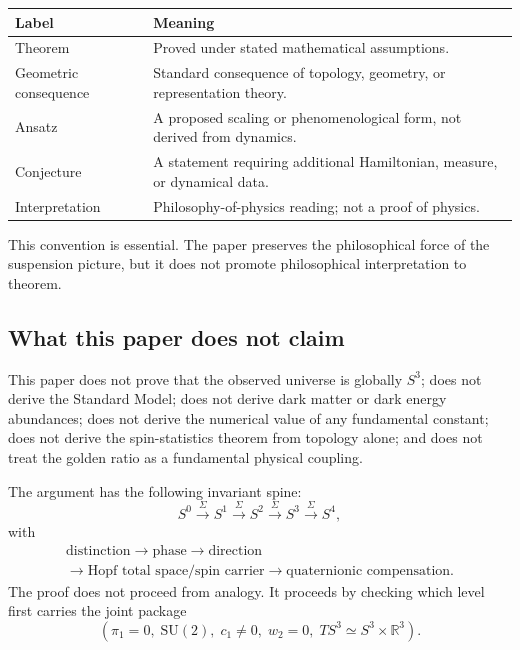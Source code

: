 \documentclass[11pt,a4paper]{article}
\theoremstyle{definition}
\theoremstyle{remark}
\newcommand{\Szero}{S^{0}}
\newcommand{\Sone}{S^{1}}
\newcommand{\Stwo}{S^{2}}
\newcommand{\Sthree}{S^{3}}
\newcommand{\Sfour}{S^{4}}
\newcommand{\R}{\mathbb{R}}
\newcommand{\SU}{\mathrm{SU}}
\begin{document}
\begin{center}
\small
\begin{tabularx}{\textwidth}{@{}lX@{}}
\toprule
\textbf{Label} & \textbf{Meaning} \\
\midrule
Theorem & Proved under stated mathematical assumptions.\\
Geometric consequence & Standard consequence of topology, geometry, or representation theory.\\
Ansatz & A proposed scaling or phenomenological form, not derived from dynamics.\\
Conjecture & A statement requiring additional Hamiltonian, measure, or dynamical data.\\
Interpretation & Philosophy-of-physics reading; not a proof of physics.\\
\bottomrule
\end{tabularx}
\end{center}

This convention is essential.  The paper preserves the philosophical force of the suspension
picture, but it does not promote philosophical interpretation to theorem.

\subsection{What this paper does not claim}

\begin{tcolorbox}[colback=gray!4,colframe=gray!50,title=Boundary of the paper]
This paper does not prove that the observed universe is globally $\Sthree$; does not derive the
Standard Model; does not derive dark matter or dark energy abundances; does not derive the
numerical value of any fundamental constant; does not derive the spin-statistics theorem from
topology alone; and does not treat the golden ratio as a fundamental physical coupling.
\end{tcolorbox}

\begin{tcolorbox}[colback=blue!3,colframe=blue!45!black,title=Structural roadmap]
The argument has the following invariant spine:
\[
\Szero \xrightarrow{\Sigma} \Sone \xrightarrow{\Sigma} \Stwo
\xrightarrow{\Sigma} \Sthree \xrightarrow{\Sigma} \Sfour ,
\]
with
\[
\begin{gathered}
\text{distinction}\to\text{phase}\to\text{direction}\\
\to\text{Hopf total space/spin carrier}
\to\text{quaternionic compensation}.
\end{gathered}
\]
The proof does not proceed from analogy.  It proceeds by checking which level first carries
the joint package
\[
(\pi_{1}=0,\;\SU(2),\;c_{1}\neq0,\;w_{2}=0,\;T\Sthree\simeq\Sthree\times\R^{3}).
\]
\end{tcolorbox}
\end{document}
